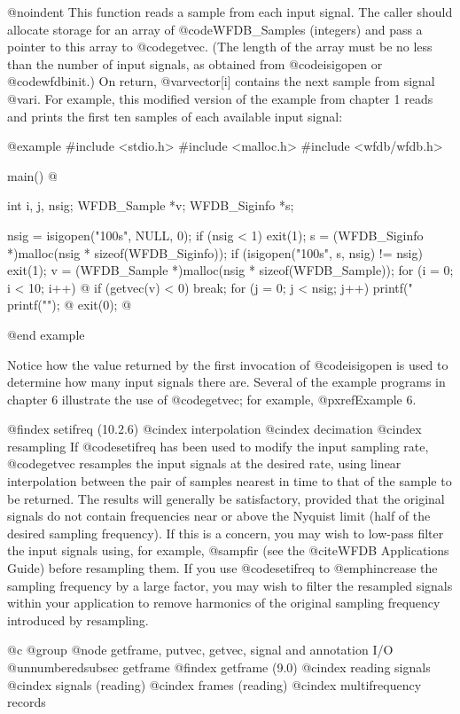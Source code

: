 {{{{{{{{{@noindent
This function reads a sample from each input signal.  The caller should
allocate storage for an array of @code{WFDB_Sample}s (integers) and pass a
pointer to this array to @code{getvec}.  (The length of the array must
be no less than the number of input signals, as obtained from
@code{isigopen} or @code{wfdbinit}.)  On return, @var{vector[i]}
contains the next sample from signal @var{i}.  For example, this
modified version of the example from chapter 1 reads and prints the
first ten samples of each available input signal:

@example
#include <stdio.h>
#include <malloc.h>
#include <wfdb/wfdb.h>

main()
@{
    int i, j, nsig;
    WFDB_Sample *v;
    WFDB_Siginfo *s;

    nsig = isigopen("100s", NULL, 0);
    if (nsig < 1)
        exit(1);
    s = (WFDB_Siginfo *)malloc(nsig * sizeof(WFDB_Siginfo));
    if (isigopen("100s", s, nsig) != nsig)
        exit(1);
    v = (WFDB_Sample *)malloc(nsig * sizeof(WFDB_Sample));
    for (i = 0; i < 10; i++) @{
        if (getvec(v) < 0)
            break;
        for (j = 0; j < nsig; j++)
            printf("%
        printf("\n");
    @}
    exit(0);
@}
@end example

Notice how the value returned by the first invocation of @code{isigopen}
is used to determine how many input signals there are.  Several of the
example programs in chapter 6 illustrate the use of @code{getvec}; for
example, @pxref{Example 6}.

@findex setifreq (10.2.6)
@cindex interpolation
@cindex decimation
@cindex resampling
If @code{setifreq} has been used to modify the input sampling rate,
@code{getvec} resamples the input signals at the desired rate, using
linear interpolation between the pair of samples nearest in time to that
of the sample to be returned.  The results will generally be
satisfactory, provided that the original signals do not contain
frequencies near or above the Nyquist limit (half of the desired
sampling frequency).  If this is a concern, you may wish to low-pass
filter the input signals using, for example, @samp{fir} (see the
@cite{WFDB Applications Guide}) before resampling them.  If you use
@code{setifreq} to @emph{increase} the sampling frequency by a large
factor, you may wish to filter the resampled signals within your
application to remove harmonics of the original sampling frequency
introduced by resampling.

@c @group
@node    getframe, putvec, getvec, signal and annotation I/O
@unnumberedsubsec getframe
@findex getframe (9.0)
@cindex reading signals
@cindex signals (reading)
@cindex frames (reading)
@cindex multifrequency records

}}}}}}}}}
